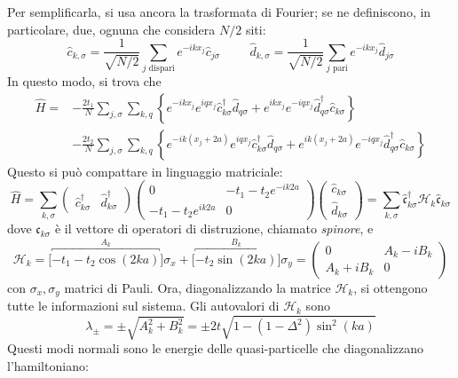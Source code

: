 \documentclass[11pt, a4paper]{scrartcl}
\theoremstyle{style}
\theoremstyle{style1}
\numberwithin{equation}{subsection}
\begin{document}
Per semplificarla, si usa ancora la trasformata di Fourier; se ne definiscono, in particolare, due, ognuna che considera $N / 2$ siti:
\[
\hat{c}_{k,\sigma }  = \frac{1}{\sqrt{N / 2} } \sum_{j \text{ dispari}}^{} e^{-i k x_j}\hat{c}_{j\sigma } \hspace{1cm} \hat{d}_{k,\sigma }  = \frac{1}{\sqrt{ N / 2} } \sum_{j \text{ pari}}^{} e^{-ikx_j}\hat{d}_{j\sigma } 
\] 
In questo modo, si trova che
\[
	\begin{split}
		\hat{H} = &  - \frac{2 t_1}{N} \sum_{j,\sigma }^{}\sum_{k,q}^{} \left\{ e^{-ikx_j}e^{iqx_j}\hat{c}^\dagger _{k\sigma } \hat{d}_{q\sigma } +e^{ikx_j}e^{-iqx_j}\hat{d}^\dagger _{q\sigma } \hat{c}_{k\sigma }  \right\} \\
			  & - \frac{2t_2}{N} \sum_{j,\sigma }^{} \sum_{k,q}^{} \left\{ e^{-ik(x_j +2a)}e^{iqx_j}\hat{c}^\dagger _{k\sigma } \hat{d}_{q\sigma } +  e^{ik(x_j +2a)}e^{-iqx_j} \hat{d}^\dagger_{q\sigma } \hat{c} _{k\sigma }\right\} 
	\end{split}
\] 
Questo si pu\`o compattare in linguaggio matriciale:
\[
	\hat{H} = \sum_{k,\sigma }^{} \begin{pmatrix} \hat{c}^\dagger _{k\sigma } & \hat{d}^\dagger _{k\sigma }  \end{pmatrix} \begin{pmatrix} 0 & - t_1 - t_2 e^{-ik 2a}\\ - t_1 - t_2 e^{ik 2a} & 0 \end{pmatrix} \begin{pmatrix} \hat{c}_{k\sigma } \\ \hat{d}_{k\sigma }  \end{pmatrix}= \sum_{k,\sigma }^{}\hat{\mathfrak{c} }_{k\sigma } ^\dagger  \mathcal{H} _k \hat{\mathfrak{c} }_{k\sigma } 
\] 
dove $\hat{\mathfrak{c} }_{k\sigma } $ \`e il vettore di operatori di distruzione, chiamato \textit{spinore}, e 
\[
	\mathcal{H} _k = \Big[\overbracket{-t_1-t_2 \cos (2ka)}^{A_k} \Big]\sigma _x + \Big[\overbracket{-t_2\sin (2ka)}^{B_k} \Big]\sigma _y = \begin{pmatrix} 0 & A_k - i B_k\\ A_k + i B_k & 0  \end{pmatrix} 
\] 
con $\sigma _x,\sigma _y$ matrici di Pauli.
Ora, diagonalizzando la matrice $\mathcal{H} _k$, si ottengono tutte le informazioni sul sistema.
Gli autovalori di $\mathcal{H} _k$ sono 
\[
\lambda _{\pm} = \pm \sqrt{A_k^2 + B_k^2}  = \pm 2t \sqrt{1 - (1-\Delta ^2) \sin^2 (ka)} 
\] 
Questi modi normali sono le energie delle quasi-particelle che diagonalizzano l'hamiltoniano:
\end{document}
